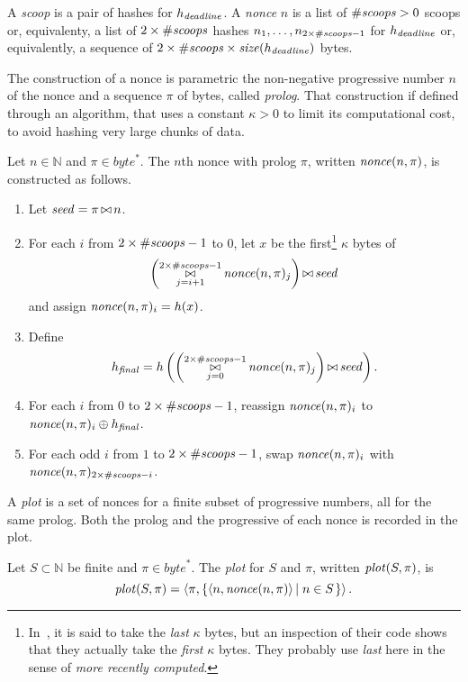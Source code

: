 %
\begin{definition}
  A \emph{scoop} is a pair of hashes for $h_{\mathit{deadline}}$. A \emph{nonce} $n$ is a list of
  ${\#\mathit{scoops}}>0$ scoops or, equivalenty, a list of $2\times{\#\mathit{scoops}}$
  hashes $n_1,\ldots,n_{2\times{\#\mathit{scoops}}-1}$ for $h_{\mathit{deadline}}$ or, equivalently, a sequence of
  $2\times{\#\mathit{scoops}}\times{\mathit{size}}(h_{\mathit{deadline}})$ bytes.
\end{definition}
%
The construction of a nonce is parametric \wrt the non-negative progressive number
$n$ of the nonce and a sequence $\pi$ of bytes, called \emph{prolog}.
That construction if defined through an algorithm, that
uses a constant $\kappa>0$ to limit its computational cost, to avoid hashing
very large chunks of data.
%
\begin{definition}[$\nonce(n,\pi)$]
  Let $n\in\mathbb{N}$ and $\pi\in\mathit{byte}^*$. 
  The $n$th nonce with prolog $\pi$, written
  $\nonce(n,\pi)$, is constructed as follows.
  \begin{enumerate}
  \item Let ${\mathit{seed}}=\pi\operatorname*{\bowtie} n$.
  \item For each $i$ from $2\times{\#\mathit{scoops}}-1$ to $0$, let
    $x$ be the first\footnote{In~\cite{SignumPlotting}, it is said to
  take the \emph{last} $\kappa$ bytes, but an inspection of their code
  shows that they actually take the \emph{first} $\kappa$ bytes. They
  probably use \emph{last} here in the sense of \emph{more recently computed}.}
    $\kappa$ bytes of
    \[
    \left(\operatorname*{\bowtie}_{j=i+1}^{2\times{\#\mathit{scoops}}-1}{\mathit{nonce}}(n,\pi)_j\right)\operatorname*{\bowtie}{\mathit{seed}}
    \]
    and assign ${\mathit{nonce}}(n,\pi)_i=h(x)$.
  \item Define
    \[
    {h_{\mathit{final}}}=h\left(\left(\operatorname*{\bowtie}_{j=0}^{2\times{\#\mathit{scoops}}-1}{\mathit{nonce}}(n,\pi)_j\right)\operatorname*{\bowtie}{\mathit{seed}}\right).
    \]
  \item For each $i$ from $0$ to $2\times{\#\mathit{scoops}}-1$, reassign
    ${\mathit{nonce}}(n,\pi)_i$ to ${\mathit{nonce}}(n,\pi)_i\oplus{h_{\mathit{final}}}$.
  \item For each odd $i$ from $1$ to $2\times{\#\mathit{scoops}}-1$, swap
    ${\mathit{nonce}}(n,\pi)_i$ with ${\mathit{nonce}}(n,\pi)_{2\times{\#\mathit{scoops}}-i}$.
  \end{enumerate}
\end{definition}
%
A \emph{plot} is a set of nonces for a finite subset of progressive numbers,
all for the same prolog. Both the prolog and the progressive of each nonce
is recorded in the plot.
%
\begin{definition}[$\plot(S,\pi)$]
  Let $S\subset\mathbb{N}$ be finite and $\pi\in\mathit{byte}^*$.
  The \emph{plot} for $S$ and $\pi$, written $\plot(S,\pi)$, is
  \[
  {\mathit{plot}}(S,\pi)=\left<\pi,\left\{\left<n,{\mathit{nonce}}(n,\pi)\right>\left|\;n\in S\right.\right\}\right>.
  \]
\end{definition}
